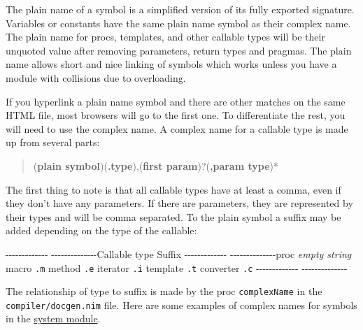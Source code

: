 The plain name of a symbol is a simplified version of its fully exported
signature. Variables or constants have the same plain name symbol as
their complex name. The plain name for procs, templates, and other
callable types will be their unquoted value after removing parameters,
return types and pragmas. The plain name allows short and nice linking
of symbols which works unless you have a module with collisions due to
overloading.

If you hyperlink a plain name symbol and there are other matches on the
same HTML file, most browsers will go to the first one. To differentiate
the rest, you will need to use the complex name. A complex name for a
callable type is made up from several parts:

\begin{quote}
(\textbf{plain symbol})(\textbf{.type}),(\textbf{first
param})?(\textbf{,param type})*
\end{quote}

The first thing to note is that all callable types have at least a
comma, even if they don't have any parameters. If there are parameters,
they are represented by their types and will be comma separated. To the
plain symbol a suffix may be added depending on the type of the
callable:

-\/-\/-\/-\/-\/-\/-\/-\/-\/-\/-\/-\/-
-\/-\/-\/-\/-\/-\/-\/-\/-\/-\/-\/-\/-\/-Callable type Suffix
-\/-\/-\/-\/-\/-\/-\/-\/-\/-\/-\/-\/-
-\/-\/-\/-\/-\/-\/-\/-\/-\/-\/-\/-\/-\/-proc \emph{empty string} macro
\texttt{.m} method \texttt{.e} iterator \texttt{.i} template \texttt{.t}
converter \texttt{.c} -\/-\/-\/-\/-\/-\/-\/-\/-\/-\/-\/-\/-
-\/-\/-\/-\/-\/-\/-\/-\/-\/-\/-\/-\/-\/-

The relationship of type to suffix is made by the proc
\texttt{complexName} in the \texttt{compiler/docgen.nim} file. Here are
some examples of complex names for symbols in the
\href{system.html}{system module}.

